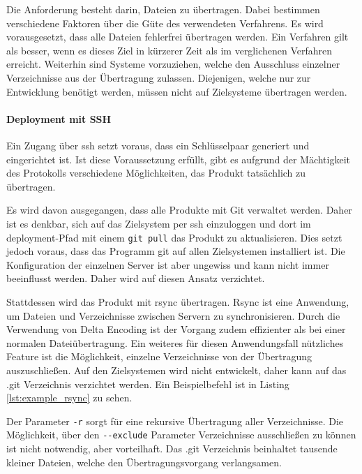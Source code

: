 Die Anforderung besteht darin, Dateien zu übertragen. Dabei bestimmen verschiedene Faktoren über die Güte des verwendeten Verfahrens. Es wird vorausgesetzt, dass alle Dateien fehlerfrei übertragen werden. Ein Verfahren gilt als besser, wenn es dieses Ziel in kürzerer Zeit als im verglichenen Verfahren erreicht. Weiterhin sind Systeme vorzuziehen, welche den Ausschluss einzelner Verzeichnisse aus der Übertragung zulassen. Diejenigen, welche nur zur Entwicklung benötigt werden, müssen nicht auf Zielsysteme übertragen werden.

\paragraph{Deployment mit SSH} %
\label{par:deployment_mit_ssh}

Ein Zugang über \gls{ssh} setzt voraus, dass ein Schlüsselpaar generiert und eingerichtet ist. Ist diese Voraussetzung erfüllt, gibt es aufgrund der Mächtigkeit des Protokolls verschiedene Möglichkeiten, das Produkt tatsächlich zu übertragen.

Es wird davon ausgegangen, dass alle Produkte mit Git verwaltet werden. Daher ist es denkbar, sich auf das Zielsystem per \gls{ssh} einzuloggen und dort im \Gls{deployment}-Pfad mit einem \lstinline!git pull! das Produkt zu aktualisieren. Dies setzt jedoch voraus, dass das Programm git auf allen Zielsystemen installiert ist. Die Konfiguration der einzelnen Server ist aber ungewiss und kann nicht immer beeinflusst werden. Daher wird auf diesen Ansatz verzichtet.

Stattdessen wird das Produkt mit \gls{rsync} übertragen. Rsync ist eine Anwendung, um Dateien und Verzeichnisse zwischen Servern zu synchronisieren. Durch die Verwendung von Delta Encoding ist der Vorgang zudem effizienter als bei einer normalen Dateiübertragung. Ein weiteres für diesen Anwendungsfall nützliches Feature ist die Möglichkeit, einzelne Verzeichnisse von der Übertragung auszuschließen. Auf den Zielsystemen wird nicht entwickelt, daher kann auf das .git Verzeichnis verzichtet werden. Ein Beispielbefehl ist in Listing \ref{lst:example_rsync} zu sehen.

Der Parameter \lstinline!-r! sorgt für eine rekursive Übertragung aller Verzeichnisse. Die Möglichkeit, über den \lstinline!--exclude! Parameter Verzeichnisse ausschließen zu können ist nicht notwendig, aber vorteilhaft. Das .git Verzeichnis beinhaltet tausende kleiner Dateien, welche den Übertragungsvorgang verlangsamen.


